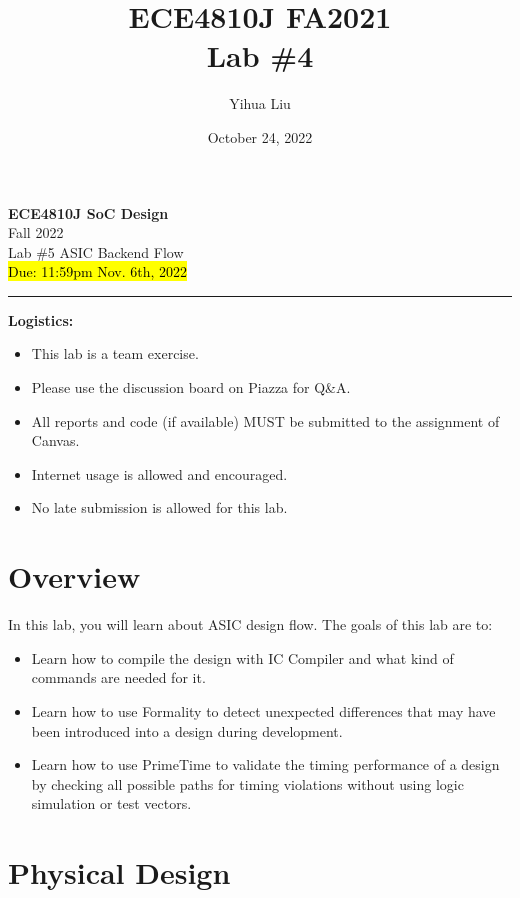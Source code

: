 \documentclass[a4paper,12pt,twoside]{article}
\author{Yihua Liu}
\title{ECE4810J FA2021\\ \small Lab \#4}
\date{October 24, 2022}
\begin{document}
\thispagestyle{fancy}

\begin{center}
    \vspace*{0pt}
    \Large{\textbf{ECE4810J SoC Design}}\\
    \vspace*{2pt}
    \large{Fall 2022}\\
    \vspace*{10pt}
    \Large{\textcolor{caption2color}{Lab \#5 ASIC Backend Flow}}\\
    \normalsize{\hl{Due: 11:59pm Nov. 6th, 2022}}
    \rule[-5pt]{.97\linewidth}{0.05em}
\end{center}

\textbf{Logistics:}
\begin{itemize}
    \item This lab is a team exercise.
    \item Please use the discussion board on Piazza for Q\&A.
    \item All reports and code (if available) MUST be submitted to the assignment of Canvas.
    \item Internet usage is allowed and encouraged.
    \item No late submission is allowed for this lab.
\end{itemize}

\tableofcontents

\newpage
\section{Overview}
In this lab, you will learn about ASIC design flow. The goals of this lab are to:
\begin{itemize}
    \item Learn how to compile the design with IC Compiler and what kind of commands are needed for it.
    \item Learn how to use Formality to detect unexpected differences that may have been introduced into a design during development.
    \item Learn how to use PrimeTime to validate the timing performance of a design by checking all possible paths for timing violations without using logic simulation or test vectors.
\end{itemize}

\section{Physical Design}\label{SPD}
\end{document}
